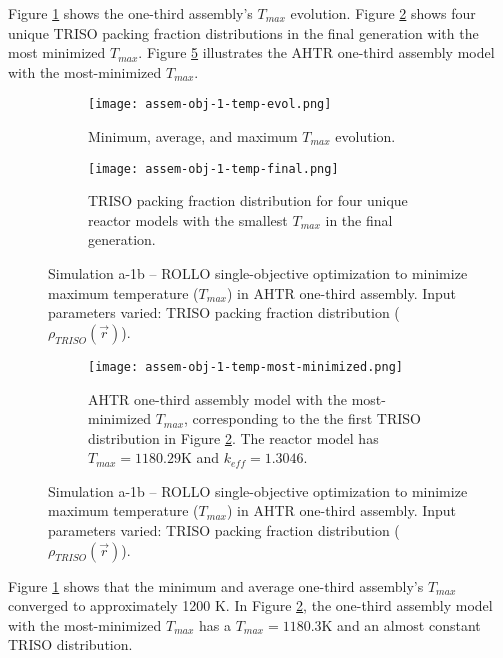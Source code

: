 Figure \ref{fig:assem-obj-1-temp-evol} shows the one-third assembly's $T_{max}$ 
evolution. 
Figure \ref{fig:assem-obj-1-temp-final} shows four unique TRISO packing fraction 
distributions in the final generation with the most minimized $T_{max}$. 
Figure \ref{fig:assem-obj-1-temp-most-minimized} illustrates the \gls{AHTR} one-third 
assembly model with the most-minimized $T_{max}$. 
\begin{figure}[htbp!]
    \centering
    \begin{subfigure}{\textwidth}
        \texttt{[image: assem-obj-1-temp-evol.png]}
        \caption{Minimum, average, and maximum $T_{max}$ evolution.}
        \label{fig:assem-obj-1-temp-evol} 
    \end{subfigure}
    \begin{subfigure}{\textwidth}
        \texttt{[image: assem-obj-1-temp-final.png]}
        \caption{TRISO packing fraction distribution for four unique reactor models with the 
        smallest $T_{max}$ in the final generation.}
        \label{fig:assem-obj-1-temp-final} 
    \end{subfigure}
    \caption{Simulation a-1b -- ROLLO single-objective optimization to minimize maximum 
    temperature ($T_{max}$) in \gls{AHTR} one-third assembly. 
    Input parameters varied: \gls{TRISO} packing fraction distribution 
    ($\rho_{TRISO}(\vec{r})$).}
    \label{fig:assem-obj-1-temp}
\end{figure}
\begin{figure}[htbp!]
    \ContinuedFloat
    \centering
    \begin{subfigure}{\textwidth}
        \texttt{[image: assem-obj-1-temp-most-minimized.png]}
        \caption{\gls{AHTR} one-third assembly model with the most-minimized 
        $T_{max}$, corresponding to the the first TRISO distribution in Figure 
        \ref{fig:assem-obj-1-temp-final}. The reactor model has $T_{max}=1180.29$K
        and $k_{eff}=1.3046$.}
        \label{fig:assem-obj-1-temp-most-minimized} 
    \end{subfigure}
    \caption{Simulation a-1b -- ROLLO single-objective optimization to minimize maximum 
    temperature ($T_{max}$) in \gls{AHTR} one-third assembly. 
    Input parameters varied: \gls{TRISO} packing fraction distribution 
    ($\rho_{TRISO}(\vec{r})$).}
\end{figure}

Figure \ref{fig:assem-obj-1-temp-evol} shows that the minimum and average one-third 
assembly's $T_{max}$ converged to approximately 1200 K.
In Figure \ref{fig:assem-obj-1-temp-final}, the one-third assembly model with the 
most-minimized $T_{max}$ has a $T_{max}=1180.3$K and an almost constant TRISO 
distribution.

